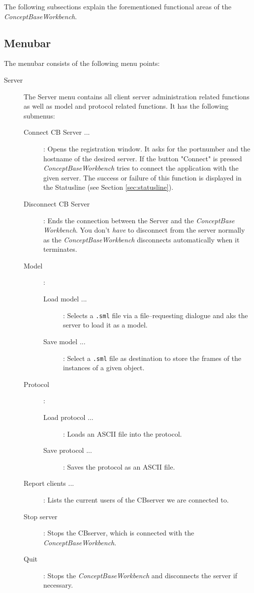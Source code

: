 The following subsections explain the forementioned functional areas of the {\em ConceptBase\/Workbench}.

\subsection{Menubar} 			\label{sec:menubar}
The menubar consists of the following menu points:

\begin{description}
\item[Server]
   The Server menu contains all client server administration related functions as well as model and protocol related functions. It has the following submenus:
	\begin{description}
	\item[Connect CB Server ...]: Opens the registration window. It asks for the portnumber and the hostname of the desired server. If the button "Connect" is pressed {\em ConceptBase\/Workbench}  tries to connect the application with the given server. The success or failure of this function is displayed in the Statusline (see Section \ref{sec:statusline}). 
	\item[Disconnect CB Server]: Ends the connection between the Server and the {\em ConceptBase} {\em Workbench}. You don't {\em have} to disconnect from the server normally as the {\em ConceptBase\/Workbench}  disconnects automatically when it terminates. 
	\item[Model]:
	  	\begin{description}
	 		\item[Load model ...]: Selects a {\tt *.sml} file via a file--requesting dialogue and aks the server to load it as a model.
	 		\item[Save model ...]: Select a {\tt *.sml} file as destination to store the frames of the instances of a given object.
		  \end{description}
	\item[Protocol]:
		\begin{description}
			 \item[Load protocol ...]: Loads an ASCII file into the protocol.
			 \item[Save protocol ...]: Saves the protocol as an ASCII file.
		\end{description}
 	\item[Report clients ...]: Lists the current users of the  CBserver we are connected to. 
	\item[Stop server]: Stops the CBserver, which is connected with the {\em ConceptBase\/Workbench}.			
	\item[Quit]: Stops the {\em ConceptBase\/Workbench}  and disconnects the server if necessary.
	\end{description}


\end{description}
